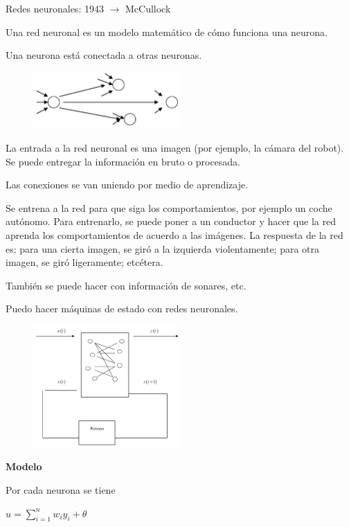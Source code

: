 Redes neuronales: 1943 $\rightarrow$  McCullock


Una red neuronal es un modelo matemático de cómo funciona una neurona.

Una neurona está conectada a otras neuronas.

\begin{figure}[h!]
	\centering
	\includegraphics[width=0.5\textwidth]{images/img72.png}
	\label{figura72}
\end{figure}

La entrada a la red neuronal es una imagen (por ejemplo, la cámara del robot). Se puede entregar la
información en bruto o procesada.

Las conexiones se van uniendo por medio de aprendizaje.

Se entrena a la red para que siga los comportamientos, por ejemplo un coche autónomo. Para entrenarlo, se
puede poner a un conductor y hacer que la red aprenda los comportamientos de acuerdo a las imágenes.
La respuesta de la red es: para una cierta imagen, se giró a la izquierda violentamente; para otra imagen, se
giró ligeramente; etcétera.

También se puede hacer con información de sonares, etc.

Puedo hacer máquinas de estado con redes neuronales.

\begin{figure}[h!]
	\centering
	\includegraphics[width=0.5\textwidth]{images/img73.png}
	\label{figura73}
\end{figure}

\textbf{Modelo}

Por cada neurona se tiene

$u = \sum_{i=1}^{n} w_i y_i + \theta $

